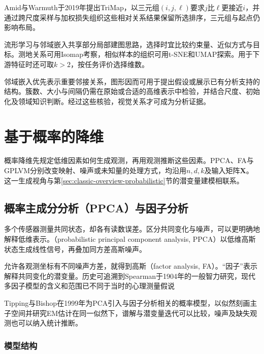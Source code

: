 Amid与Warmuth于2019年提出TriMap，以三元组$(i,j,\ell)$要求$j$比$\ell$更接近$i$，并通过跨尺度采样与加权损失组织这些相对关系结果保留所选排序，三元组与起点仍影响布局。

流形学习与邻域嵌入共享部分局部建图思路，选择时宜比较约束量、近似方式与目标。测地关系可用Isomap考察，相似样本的组织可用t-SNE和UMAP探索。用于下游特征时还可取$k>2$，按任务评价选择维数。

邻域嵌入优先表示重要邻接关系，图形因而可用于提出假设或展示已有分析支持的结构。簇数、大小与间隔仍需在原始或合适的高维表示中检验，并结合尺度、初始化及领域知识判断。经过这些核验，视觉关系才可成为分析证据。

\section{基于概率的降维}
\label{sec:dim-probabilistic}

概率降维先规定低维因素如何生成观测，再用观测推断这些因素。PPCA、FA与GPLVM分别改变映射、噪声或未知量的处理方式，均沿用$n,d,k$及输入矩阵$\bm{X}$。这一生成视角与第\ref{sec:classic-overview-probabilistic}节的潜变量建模相联系。

\subsection{概率主成分分析（PPCA）与因子分析}
\label{sec:dim-ppca}

多个传感器测量共同状态，却各有读数误差。区分共同变化与噪声，可以更明确地解释低维表示。（probabilistic principal component analysis, PPCA）以低维高斯状态生成线性信号，再叠加同方差高斯噪声。

允许各观测坐标有不同噪声方差，就得到高斯（factor analysis, FA）。“因子”表示解释共同变化的潜变量。历史可追溯到Spearman于1904年的一般智力研究，现代多因子模型的含义和范围已不同于当时的心理测量假说

Tipping与Bishop在1999年为PCA引入与因子分析相关的概率模型，以似然刻画主子空间并研究EM估计在同一似然下，谱解与潜变量迭代可以比较，噪声及缺失观测也可以纳入统计推断。

\subsubsection{模型结构}
\label{sec:dim-ppca-structure}

